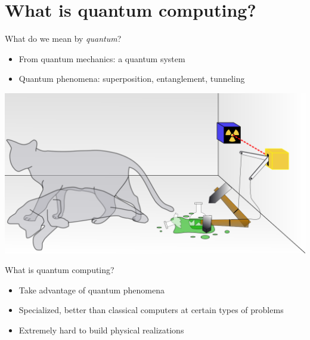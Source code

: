 \documentclass[14pt]{beamer}
\begin{document}
\section{What is quantum computing?}
\begin{frame}{What do we mean by \textit{quantum}?}
\begin{itemize}
	\item From quantum mechanics: a quantum system
	\item Quantum phenomena: superposition, 	entanglement, tunneling 
\end{itemize}
\begin{center}
\includegraphics[scale=0.15]{../resources/images/Schrodingers_cat.png}
\end{center}
\end{frame}

\begin{frame}{What is quantum computing?}
\begin{itemize}
	\item Take advantage of quantum phenomena	
	\item Specialized, better than classical computers at certain types of problems
	\item Extremely hard to build physical realizations
\end{itemize}
\end{frame}

\end{document}
